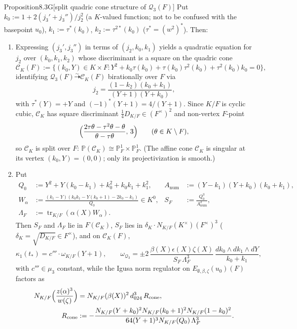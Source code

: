 \documentclass[12pt,letterpaper]{amsart}
\theoremstyle{plain}
\theoremstyle{definition}
\theoremstyle{remark}
\theoremstyle{definition}
\DeclareMathOperator{\tr}{tr}
\begin{document}
\begin{res}{Proposition}{8.3G}[split quadric cone structure of $\mathcal Q_3(F)$]\label{res:8.3G}
Put $k_0:=1+2(j_3'+j_3'')/j_2^2$ (a $K$-valued function; not to be confused with the basepoint $u_0$), $k_1:=\tau^*(k_0)$, $k_2:=\tau^{2*}(k_0)$
($\tau^*=(w^2)^*$). Then:
\begin{enumerate}[{\upshape(a)}]
\item Expressing $(j_3',j_3'')$ in terms of $(j_2,k_0,k_1)$ yields a quadratic
equation for $j_2$ over $(k_0,k_1,k_2)$ whose discriminant is a square on the
quadric cone
\begin{equation}\tag{8.7g}\label{eq:8.7g}
\mathcal C_K(F):=\bigl\{(k_0,Y)\in K\times F :
Y^2+k_0\tau(k_0)+\tau(k_0)\tau^2(k_0)+\tau^2(k_0)k_0=0\bigr\},
\end{equation}
identifying $\mathcal Q_3(F)\stackrel{\sim}{\dashrightarrow}\mathcal C_K(F)$
birationally over $F$ via
\[
j_2=\frac{(1-k_2)(k_0+k_1)}{(Y+1)(Y+k_0)},
\]
with
$\tau^*(Y)=+Y$ and $(-1)^*(Y+1)=4/(Y+1)$. Since $K/F$ is cyclic cubic,
$\mathcal C_K$ has square discriminant $\tfrac14 D_{K/F}\in(F^\times)^2$ and
non-vertex $F$-point
\[
\Bigl(\frac{2\tau\theta-\tau^2\theta-\theta}{\theta-\tau\theta},\,3\Bigr)
\qquad(\theta\in K\setminus F),
\]
so $\mathcal C_K$ is split over $F$:
$\mathbb{P}(\mathcal C_K)\cong\mathbb{P}^1_F\times\mathbb{P}^1_F$. (The affine
cone $\mathcal C_K$ is singular at its vertex $(k_0,Y)=(0,0)$; only its
projectivization is smooth.)
\item Put
\begin{align*}
Q_0&:=Y^2+Y(k_0-k_1)+k_0^2+k_0k_1+k_1^2, &
A_{\mathrm{num}}&:=(Y-k_1)(Y+k_0)(k_0+k_1),\\
W_\alpha&:=\frac{(k_1-Y)(k_0k_1-Y(k_0+1)-2k_0-k_1)}{Q_0}\in K^0, &
S_F&:=\frac{Q_0^3}{A_{\mathrm{num}}^2},\\
\Lambda_F&:=\tr_{K/F}(\alpha(X)W_\alpha).
\end{align*}
Then $S_F$ and $\Lambda_F$ lie in $F(\mathcal C_K)$, $S_F$ lies
in $\delta_K\cdot N_{K/F}(K^\times)(F^\times)^3$ ($\delta_K=\sqrt{D_{K/F}}\in F^\times$),
and on $\mathcal C_K(F)$,
\begin{equation}\tag{8.7h}\label{eq:8.7h}
\kappa_1(t_*)=c'''\cdot\omega_{K/F}(Y+1),\qquad
\omega_{\mathcal Q_3}=\pm 2\,\frac{\beta(X)\epsilon(X)\zeta(X)}{S_F\,\Lambda_F^3}\,
\frac{dk_0\wedge dk_1\wedge dY}{k_0+k_1},
\end{equation}
with $c'''\in\mu_3$ constant, while the Igusa norm regulator on
$E_{\emptyset,\beta,\zeta}(u_0)(F)$ factors as
\begin{align*}
N_{K/F}\Bigl(\frac{z(\alpha)^3}{w(\zeta)}\Bigr)&=N_{K/F}(\beta(X))^2\,d_{024}^3\,R_{\mathrm{cone}},\\
R_{\mathrm{cone}}&:=-\frac{N_{K/F}(Y+k_0)^2N_{K/F}(k_0+1)^2N_{K/F}(1-k_0)^2}
{64(Y+1)^3N_{K/F}(Q_0)\,\Lambda_F^3}.
\end{align*}
\end{enumerate}
\end{res}
\end{document}
